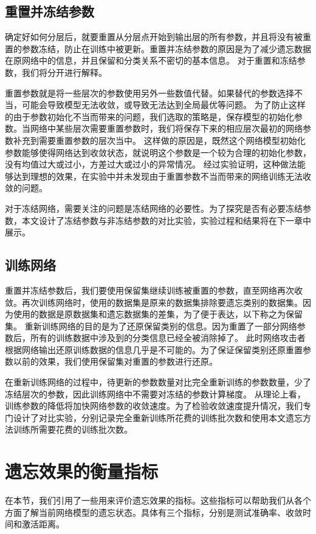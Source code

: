 \subsection{重置并冻结参数}
确定好如何分层后，就要重置从分层点开始到输出层的所有参数，并且将没有被重置的参数冻结，防止在训练中被更新。重置并冻结参数的原因是为了减少遗忘数据在原网络中的信息，并且保留和分类关系不密切的基本信息。
对于重置和冻结参数，我们将分开进行解释。

重置参数就是将一些层次的参数使用另外一些数值代替。如果替代的参数选择不当，可能会导致模型无法收敛，或导致无法达到全局最优等问题。
为了防止这样的由于参数初始化不当而带来的问题，我们选取的策略是，保存模型的初始化参数。当网络中某些层次需要重置参数时，我们将保存下来的相应层次最初的网络参数补充到需要重置参数的层次当中。
这样做的原因是，既然这个网络模型初始化参数能够使得网络达到收敛状态，就说明这个参数是一个较为合理的初始化参数，没有均值过大或过小，方差过大或过小的异常情况。
经过实验证明，这种做法能够达到理想的效果，在实验中并未发现由于重置参数不当而带来的网络训练无法收敛的问题。

对于冻结网络，需要关注的问题是冻结网络的必要性。为了探究是否有必要冻结参数，本文设计了冻结参数与非冻结参数的对比实验，实验过程和结果将在下一章中展示。

\subsection{训练网络}
重置并冻结参数后，我们要使用保留集继续训练被重置的参数，直至网络再次收敛。再次训练网络时，使用的数据集是原来的数据集排除要遗忘类别的数据集。因为使用的数据是原数据集和遗忘数据集的差集，为了便于表达，以下称之为保留集。
重新训练网络的目的是为了还原保留类别的信息。因为重置了一部分网络参数后，所有的训练数据中涉及到的分类信息已经全被消除掉了。
此时网络攻击者根据网络输出还原训练数据的信息几乎是不可能的。为了保证保留类别还原重置参数以前的效果，我们使用保留集对重置的参数进行还原。

在重新训练网络的过程中，待更新的参数数量对比完全重新训练的参数数量，少了冻结层次的参数，因此训练网络中不需要对冻结的参数计算梯度。
从理论上看，训练参数的降低将加快网络参数的收敛速度。为了检验收敛速度提升情况，我们专门设计了对比实验，分别记录完全重新训练所花费的训练批次数和使用本文遗忘方法训练所需要花费的训练批次数。

\section{遗忘效果的衡量指标} \label{forget_evaluation_index}
在本节，我们引用了一些用来评价遗忘效果的指标。这些指标可以帮助我们从各个方面了解当前网络模型的遗忘状态。具体有三个指标，分别是测试准确率、收敛时间和激活距离。

